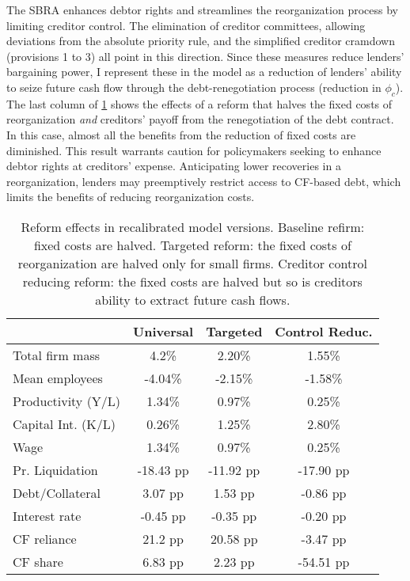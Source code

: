 \documentclass[12pt]{article}
\begin{document}
The SBRA enhances debtor rights and streamlines the reorganization process by limiting creditor control. The elimination of creditor committees, allowing deviations from the absolute priority rule, and the simplified creditor cramdown (provisions 1 to 3) all point in this direction. Since these measures reduce lenders' bargaining power, I represent these in the model as a reduction of lenders' ability to seize future cash flow through the debt-renegotiation process (reduction in $\phi_c$). The last column of \ref{tab:percentage_changes2} shows the effects of a reform that halves the fixed costs of reorganization \textit{and} creditors' payoff from the renegotiation of the debt contract. In this case, almost all the benefits from the reduction of fixed costs are diminished. This result warrants caution for policymakers seeking to enhance debtor rights at creditors' expense. Anticipating lower recoveries in a reorganization, lenders may preemptively restrict access to CF-based debt, which limits the benefits of reducing reorganization costs. 

\begin{table}[H]
    \centering
    \begin{tabular}{lccc}
     & \textbf{Universal} & \textbf{Targeted} & \textbf{Control Reduc.} \\    
    \toprule
    Total firm mass & 4.2\%  & 2.20\% & 1.55\%  \\  
    Mean employees & -4.04\%  & -2.15\% & -1.58\%   \\  
    Productivity (Y/L) & 1.34\%  & 0.97\% & 0.25\%  \\  
    Capital Int. (K/L) & 0.26\%  & 1.25\% & 2.80\%  \\  
    Wage & 1.34\%  & 0.97\% & 0.25\%  \vspace{2mm}  \\  
    Pr. Liquidation & -18.43 pp  & -11.92 pp & -17.90 pp \\  
    Debt/Collateral & 3.07 pp  &  1.53 pp & -0.86 pp  \\  
    Interest rate & -0.45 pp  & -0.35 pp & -0.20 pp  \\  
    CF reliance & 21.2 pp  & 20.58 pp & -3.47 pp  \\    
    CF share & 6.83 pp  & 2.23 pp & -54.51 pp  \\  
    \bottomrule
    \end{tabular}
    \caption{\small Reform effects in recalibrated model versions. Baseline refirm: fixed costs are halved. Targeted reform: the fixed costs of reorganization are halved only for small firms. Creditor control reducing reform: the fixed costs are halved but so is creditors ability to extract future cash flows.}
    \label{tab:percentage_changes2}
\end{table}
\end{document}
